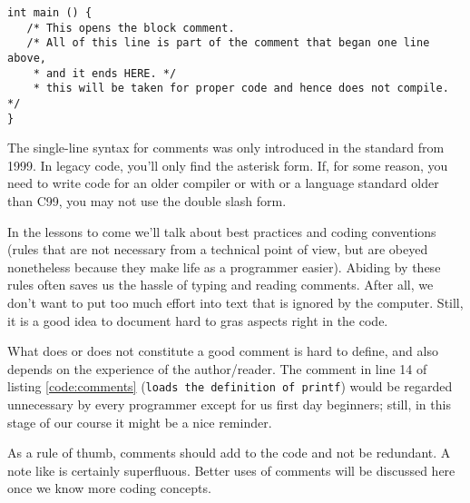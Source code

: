 \begin{warnbox}[nested block comments, leftupper=7mm]
\begin{verbatim}
int main () {
   /* This opens the block comment.
   /* All of this line is part of the comment that began one line above,
    * and it ends HERE. */
    * this will be taken for proper code and hence does not compile. */
}
\end{verbatim}
\end{warnbox}

\begin{plusbox}
The single-line syntax for comments was only introduced in the standard from 1999. In legacy code, you'll only find the asterisk form. If, for some reason, you need to write code for an older compiler or with or a language standard older than C99, you may not use the double slash form.
\end{plusbox}

In the lessons to come we'll talk about best practices and coding conventions (rules that are not necessary from a technical point of view, but are obeyed nonetheless because they make life as a programmer easier). Abiding by these rules often saves us the hassle of typing and reading comments. After all, we don't want to put too much effort into text that is ignored by the computer. Still, it is a good idea to document hard to gras aspects right in the code.

What does or does not constitute a good comment is hard to define, and also depends on the experience of the author/reader. The comment in line 14 of listing \ref{code:comments} (\texttt{loads the definition of printf}) would be regarded unnecessary by every programmer except for us first day beginners; still, in this stage of our course it might be a nice reminder.

As a rule of thumb, comments should add to the code and not be redundant. A note like 
\vspace{-9pt}
\vspace{-9pt}
is certainly superfluous. Better uses of comments will be discussed here once we know more coding concepts.

